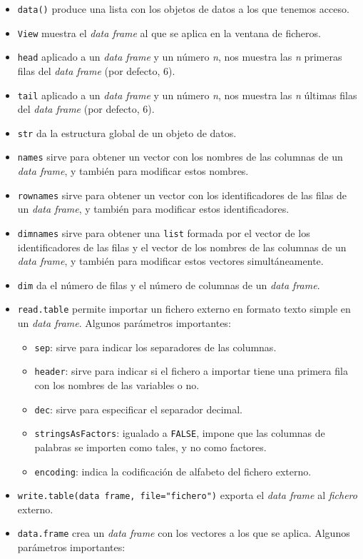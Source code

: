 \documentclass[
]{book}
\providecommand{\tightlist}{%
  \setlength{\itemsep}{0pt}\setlength{\parskip}{0pt}}
\theoremstyle{definition}
\theoremstyle{definition}
\theoremstyle{definition}
\theoremstyle{remark}
\begin{document}
\begin{itemize}
\tightlist
\item
  \texttt{data()} produce una lista con los objetos de datos a los que tenemos acceso.
\item
  \texttt{View} muestra el \emph{data frame} al que se aplica en la ventana de ficheros.
\item
  \texttt{head} aplicado a un \emph{data frame} y un número \emph{n}, nos muestra las \emph{n} primeras filas del \emph{data frame} (por defecto, 6).
\item
  \texttt{tail} aplicado a un \emph{data frame} y un número \emph{n}, nos muestra las \emph{n} últimas filas del \emph{data frame} (por defecto, 6).
\item
  \texttt{str} da la estructura global de un objeto de datos.
\item
  \texttt{names} sirve para obtener un vector con los nombres de las columnas de un \emph{data frame}, y también para modificar estos nombres.
\item
  \texttt{rownames} sirve para obtener un vector con los identificadores de las filas de un \emph{data frame}, y también para modificar estos identificadores.
\item
  \texttt{dimnames} sirve para obtener una \texttt{list} formada por el vector de los identificadores de las filas y el vector de los nombres de las columnas de un \emph{data frame}, y también para modificar estos vectores simultáneamente.
\item
  \texttt{dim} da el número de filas y el número de columnas de un \emph{data frame}.
\item
  \texttt{read.table} permite importar un fichero externo en formato texto simple en un \emph{data frame}. Algunos parámetros importantes:

  \begin{itemize}
  \tightlist
  \item
    \texttt{sep}: sirve para indicar los separadores de las columnas.
  \item
    \texttt{header}: sirve para indicar si el fichero a importar tiene una primera fila con los nombres de las variables o no.
  \item
    \texttt{dec}: sirve para especificar el separador decimal.
  \item
    \texttt{stringsAsFactors}: igualado a \texttt{FALSE}, impone que las columnas de palabras se importen como tales, y no como factores.
  \item
    \texttt{encoding}: indica la codificación de alfabeto del fichero externo.
  \end{itemize}
\item
  \texttt{write.table(data\ frame,\ file="fichero")} exporta el \emph{data frame} al \emph{fichero} externo.
\item
  \texttt{data.frame} crea un \emph{data frame} con los vectores a los que se aplica. Algunos parámetros importantes:


\end{itemize}
\end{document}
